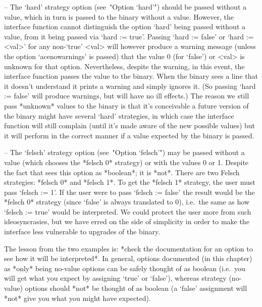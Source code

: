 \beginlist

\item{--} The `hard' strategy option (see~"Option `hard'")  should  be
passed without a value, which in turn is passed to the  {\ACE}  binary
without  a  value.  However,  the  {\ACE}  interface  function  cannot
distinguish the option `hard' being passed without a  value,  from  it
being passed via `hard := true'. Passing `hard := false' or  `hard  :=
<val>' for any non-`true' <val> will however produce a warning message
(unless the option `acenowarnings' is passed) that the  value  0  (for
`false') or <val> is unknown for that  option.  Nevertheless,  despite
the warning, in this event, the {\ACE} interface function  passes  the
value to the {\ACE} binary. When the {\ACE} binary sees a line that it
doesn't understand it prints a warning  and  simply  ignores  it.  (So
passing `hard := false' will produce warnings, but will  have  no  ill
effects.) The reason we still pass  *unknown*  values  to  the  {\ACE}
binary is that it's conceivable a future version of the {\ACE}  binary
might have  several  `hard'  strategies,  in  which  case  the  {\ACE}
interface function will still complain (until it's made aware  of  the
new possible values) but it will perform in the correct  manner  if  a
value expected by the {\ACE} binary is passed.

\item{--} The `felsch' strategy option (see~"Option `felsch'") may  be
passed without a value (which chooses the *felsch 0* strategy) or with
the values 0 or 1. Despite the fact that {\GAP} sees  this  option  as
*boolean*; it is *not*. There are two Felsch  strategies:  *felsch  0*
and *felsch 1*. To get the *felsch 1* strategy,  the  user  must  pass
`felsch := 1'. If the user were to pass `felsch := false'  the  result
would be the *felsch 0* strategy (since `false' is  always  translated
to 0), i.e.~the same as how `felsch := true' would be interpreted.  We
could protect the user more from  such  ideosyncrasies,  but  we  have
erred on the side of simplicity in order to make  the  interface  less
vulnerable to upgrades of the {\ACE} binary.

\endlist

The lesson from the two examples is: *check the documentation  for  an
option to see  how  it  will  be  interpreted*.  In  general,  options
documented (in this chapter) as *only* being no-value options  can  be
safely thought of as boolean (i.e.~you will get  what  you  expect  by
assigning `true' or  `false'),  whereas  strategy  (no-value)  options
should *not* be thought of as boolean (a `false' assignment will *not*
give you what you might have expected).

